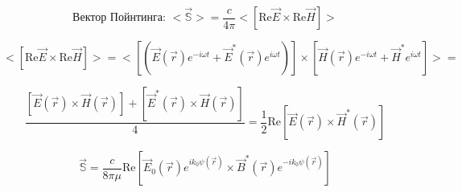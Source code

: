 \documentclass[12pt, a4paper]{report}
\begin{document}
\[ \text{Вектор Пойнтинга: }  <\vec{\mathbb{S}} >  = \frac{c }{4 \pi } <[\mathrm{Re } \vec{E } \times  \mathrm{Re } \vec{H }   ]>  \] 

\[  <[\mathrm{Re } \vec{E } \times  \mathrm{Re } \vec{H }   ]> = <[(\vec{E } (\vec{r } )e^{ -i \omega t}  + \vec{E } ^{* } (\vec{r } )e^{ i \omega t } )] \times [\vec{H }  (\vec{r } ) e^{- i \omega t } + \vec{H } ^{* } e^{ i \omega t }  ]> = \] 

\[ \frac{ [ \vec{E } (\vec{r } ) \times  \vec{H } ( \vec{r } ) ]+ [ \vec{E } ^{* } (\vec{r } )\times  \vec{H } (\vec{r } )]}{4} = \frac{1}{2 }  \mathrm{Re } [\vec{E } (\vec{r } ) \times  \vec{H } ^{ * } (\vec{r} )]   \] 

\[ \vec{\mathbb{S}} = \frac{c}{8 \pi \mu } \mathrm{Re } [\vec{E } _0 (\vec{r } ) e^{i k_0 \psi (\vec{r } )}\times \vec{B } ^{* } (\vec{r } ) e^{- i k_0 \psi (\vec{r} )}  ]    \] 


\ifdefined\mainfile
\else
    
\end{document}
